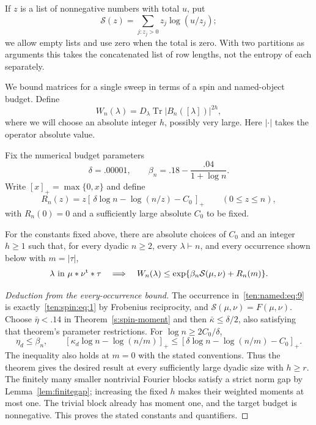 If \(z\) is a list of nonnegative numbers with total \(u\), put
\[
 \mathcal S(z)=\sum_{j:z_j>0} z_j\log(u/z_j);
\]
we allow empty lists and use zero when the total is zero. With two partitions as arguments this takes the concatenated list of row lengths, not the entropy of each separately.

We bound matrices for a single sweep in terms of a spin and named-object budget. Define
\begin{equation}
 W_n(\lambda)=D_\lambda\operatorname{Tr}|B_n([\lambda])|^{2h},
 \label{ten:named:eq:7}
\end{equation}
where we will choose an absolute integer \(h\), possibly very large. Here \(|\cdot|\) takes the operator absolute value.

Fix the numerical budget parameters
\[
 \delta=.00001,\qquad
 \beta_n=.18-\frac{.04}{1+\log n}.
\]
Write \([x]_+=\max\{0,x\}\) and define
\begin{equation}
 R_n(z)= z[\,\delta\log n-\log(n/z)-C_0\,]_+
 \qquad(0\le z\le n),
 \label{ten:named:eq:8}
\end{equation}
with \(R_n(0)=0\) and a sufficiently large absolute \(C_0\) to be fixed.

\begin{proposition}
\label{ten:named:main}
For the constants fixed above, there are absolute choices of \(C_0\) and
an integer \(h\ge1\) such that, for every dyadic \(n\ge2\), every
\(\lambda\vdash n\), and every occurrence shown below with \(m=|\tau|\),
\begin{equation}
 \lambda\ \text{in}\ \mu*\nu^{\rm t}*\tau
 \quad\Longrightarrow\quad
 W_n(\lambda)
 \le
 \exp\{ \beta_n \mathcal S(\mu,\nu)+ R_n(m)\}.
 \label{ten:named:eq:9}
\end{equation}
\end{proposition}

\begin{proof}[Deduction from the every-occurrence bound]\label{s:named-specialization}
The occurrence in~\eqref{ten:named:eq:9} is exactly~\eqref{ten:spin:eq:1} by Frobenius reciprocity, and $\mathcal S(\mu,\nu)=F(\mu,\nu)$. Choose $\bar\eta<.14$ in Theorem~\ref{s:spin-moment} and then $\bar\kappa\le\delta/2$, also satisfying that theorem's parameter restrictions. For $\log n\ge2C_0/\delta$,
\[
 \eta_d\le\beta_n,\qquad
 [\kappa_d\log n-\log(n/m)]_+
 \le[\delta\log n-\log(n/m)-C_0]_+.
\]
The inequality also holds at $m=0$ with the stated conventions. Thus the theorem gives the desired result at every sufficiently large dyadic size with $h\ge r$. The finitely many smaller nontrivial Fourier blocks satisfy a strict norm gap by Lemma~\ref{lem:finitegap}; increasing the fixed $h$ makes their weighted moments at most one. The trivial block already has moment one, and the target budget is nonnegative. This proves the stated constants and quantifiers.
\end{proof}


